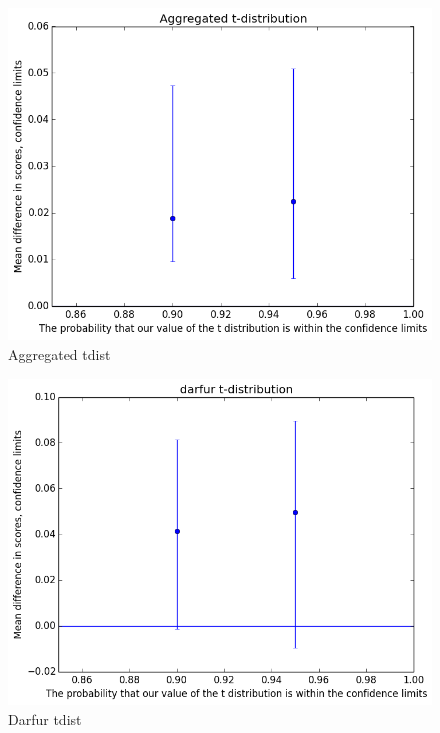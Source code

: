 			\begin{figure}[h] 
				\centering 
				\includegraphics[height=0.33\textheight]{aggregated_tdist.png} 
				\caption{Aggregated tdist}
			\end{figure}
			\begin{figure}[h] 
				\centering 
				\includegraphics[height=0.33\textheight]{darfur_tdist.png} 
				\caption{Darfur tdist}
			\end{figure}
